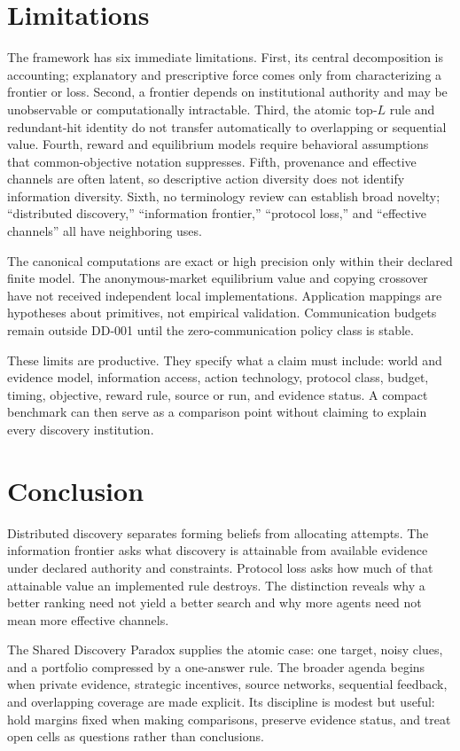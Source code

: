 \documentclass[11pt]{article}
\theoremstyle{remark}
\begin{document}
\section{Limitations}
The framework has six immediate limitations. First, its central decomposition is accounting; explanatory and prescriptive force comes only from characterizing a frontier or loss. Second, a frontier depends on institutional authority and may be unobservable or computationally intractable. Third, the atomic top-$L$ rule and redundant-hit identity do not transfer automatically to overlapping or sequential value. Fourth, reward and equilibrium models require behavioral assumptions that common-objective notation suppresses. Fifth, provenance and effective channels are often latent, so descriptive action diversity does not identify information diversity. Sixth, no terminology review can establish broad novelty; ``distributed discovery,'' ``information frontier,'' ``protocol loss,'' and ``effective channels'' all have neighboring uses.

The canonical computations are exact or high precision only within their declared finite model. The anonymous-market equilibrium value and copying crossover have not received independent local implementations. Application mappings are hypotheses about primitives, not empirical validation. Communication budgets remain outside DD-001 until the zero-communication policy class is stable.

These limits are productive. They specify what a claim must include: world and evidence model, information access, action technology, protocol class, budget, timing, objective, reward rule, source or run, and evidence status. A compact benchmark can then serve as a comparison point without claiming to explain every discovery institution.

\section{Conclusion}
Distributed discovery separates forming beliefs from allocating attempts. The information frontier asks what discovery is attainable from available evidence under declared authority and constraints. Protocol loss asks how much of that attainable value an implemented rule destroys. The distinction reveals why a better ranking need not yield a better search and why more agents need not mean more effective channels.

The Shared Discovery Paradox supplies the atomic case: one target, noisy clues, and a portfolio compressed by a one-answer rule. The broader agenda begins when private evidence, strategic incentives, source networks, sequential feedback, and overlapping coverage are made explicit. Its discipline is modest but useful: hold margins fixed when making comparisons, preserve evidence status, and treat open cells as questions rather than conclusions.



\end{document}
